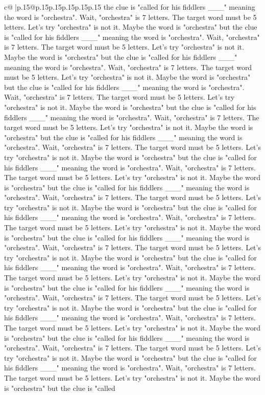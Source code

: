 \documentclass{article}
\begin{document}
{\begin{supertabular}{c@{$\;$}|p{.15\linewidth}@{}p{.15\linewidth}p{.15\linewidth}p{.15\linewidth}p{.15\linewidth}p{.15\linewidth}}
{{{the clue is "called for his fiddlers \_\_\_" meaning the word is "orchestra". Wait, "orchestra" is 7 letters. The target word must be 5 letters. Let's try "orchestra" is not it. Maybe the word is "orchestra" but the clue is "called for his fiddlers \_\_\_" meaning the word is "orchestra". Wait, "orchestra" is 7 letters. The target word must be 5 letters. Let's try "orchestra" is not it. Maybe the word is "orchestra" but the clue is "called for his fiddlers \_\_\_" meaning the word is "orchestra". Wait, "orchestra" is 7 letters. The target word must be 5 letters. Let's try "orchestra" is not it. Maybe the word is "orchestra" but the clue is "called for his fiddlers \_\_\_" meaning the word is "orchestra". Wait, "orchestra" is 7 letters. The target word must be 5 letters. Let's try "orchestra" is not it. Maybe the word is "orchestra" but the clue is "called for his fiddlers \_\_\_" meaning the word is "orchestra". Wait, "orchestra" is 7 letters. The target word must be 5 letters. Let's try "orchestra" is not it. Maybe the word is "orchestra" but the clue is "called for his fiddlers \_\_\_" meaning the word is "orchestra". Wait, "orchestra" is 7 letters. The target word must be 5 letters. Let's try "orchestra" is not it. Maybe the word is "orchestra" but the clue is "called for his fiddlers \_\_\_" meaning the word is "orchestra". Wait, "orchestra" is 7 letters. The target word must be 5 letters. Let's try "orchestra" is not it. Maybe the word is "orchestra" but the clue is "called for his fiddlers \_\_\_" meaning the word is "orchestra". Wait, "orchestra" is 7 letters. The target word must be 5 letters. Let's try "orchestra" is not it. Maybe the word is "orchestra" but the clue is "called for his fiddlers \_\_\_" meaning the word is "orchestra". Wait, "orchestra" is 7 letters. The target word must be 5 letters. Let's try "orchestra" is not it. Maybe the word is "orchestra" but the clue is "called for his fiddlers \_\_\_" meaning the word is "orchestra". Wait, "orchestra" is 7 letters. The target word must be 5 letters. Let's try "orchestra" is not it. Maybe the word is "orchestra" but the clue is "called for his fiddlers \_\_\_" meaning the word is "orchestra". Wait, "orchestra" is 7 letters. The target word must be 5 letters. Let's try "orchestra" is not it. Maybe the word is "orchestra" but the clue is "called for his fiddlers \_\_\_" meaning the word is "orchestra". Wait, "orchestra" is 7 letters. The target word must be 5 letters. Let's try "orchestra" is not it. Maybe the word is "orchestra" but the clue is "called for his fiddlers \_\_\_" meaning the word is "orchestra". Wait, "orchestra" is 7 letters. The target word must be 5 letters. Let's try "orchestra" is not it. Maybe the word is "orchestra" but the clue is "called for his fiddlers \_\_\_" meaning the word is "orchestra". Wait, "orchestra" is 7 letters. The target word must be 5 letters. Let's try "orchestra" is not it. Maybe the word is "orchestra" but the clue is "called for his fiddlers \_\_\_" meaning the word is "orchestra". Wait, "orchestra" is 7 letters. The target word must be 5 letters. Let's try "orchestra" is not it. Maybe the word is "orchestra" but the clue is "called }}}
\end{supertabular}}
\end{document}
